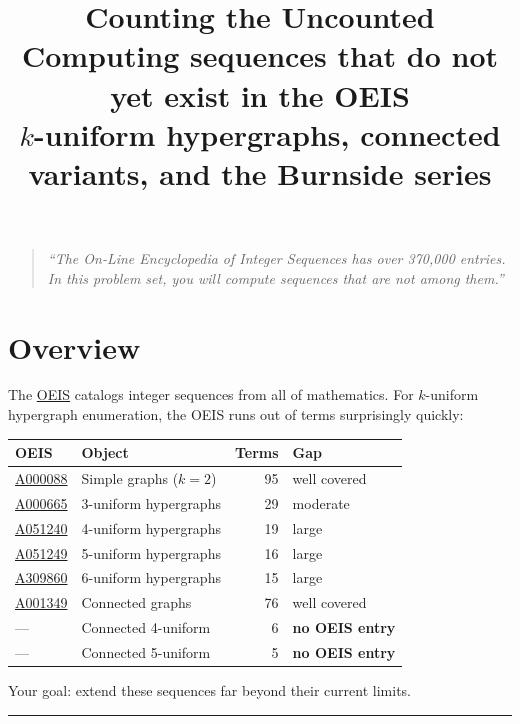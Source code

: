 \documentclass[11pt,letterpaper]{article}
\title{\vspace{-1.5em}\textbf{Counting the Uncounted} \\[6pt]
\large Computing sequences that do not yet exist in the OEIS \\[3pt]
\normalsize $k$-uniform hypergraphs, connected variants, and the Burnside series}
\author{}
\date{}
\theoremstyle{definition}
\theoremstyle{remark}
\begin{document}
\maketitle
\thispagestyle{fancy}

\begin{quote}
\textit{``The On-Line Encyclopedia of Integer Sequences has over 370{,}000 entries. In this problem set, you will compute sequences that are not among them.''}
\end{quote}

\vspace{-0.5em}

\section*{Overview}

The \href{https://oeis.org}{OEIS} catalogs integer sequences from all of mathematics. For $k$-uniform hypergraph enumeration, the OEIS runs out of terms surprisingly quickly:

\begin{center}
\begin{tabular}{llrl}
\toprule
OEIS & Object & Terms & Gap \\
\midrule
\href{https://oeis.org/A000088}{A000088} & Simple graphs ($k{=}2$) & 95 & well covered \\
\href{https://oeis.org/A000665}{A000665} & 3-uniform hypergraphs & 29 & moderate \\
\href{https://oeis.org/A051240}{A051240} & 4-uniform hypergraphs & 19 & large \\
\href{https://oeis.org/A051249}{A051249} & 5-uniform hypergraphs & 16 & large \\
\href{https://oeis.org/A309860}{A309860} & 6-uniform hypergraphs & 15 & large \\
\midrule
\href{https://oeis.org/A001349}{A001349} & Connected graphs & 76 & well covered \\
--- & Connected 4-uniform & 6 & \textbf{no OEIS entry} \\
--- & Connected 5-uniform & 5 & \textbf{no OEIS entry} \\
\bottomrule
\end{tabular}
\end{center}

Your goal: extend these sequences far beyond their current limits.

\bigskip
\hrule
\bigskip

\end{document}

